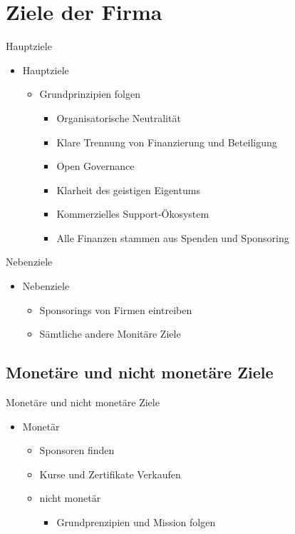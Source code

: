 \documentclass[11pt,aspectratio=169]{beamer}
\begin{document}
\section {Ziele der Firma}
\begin{frame}{Hauptziele}
	\begin{itemize}
		\item <1-> Hauptziele
		      \begin{itemize}

			      \item<2->Grundprinzipien folgen\cite{Grundprinziepe}
			            \begin{itemize}
				            \item<3-> Organisatorische Neutralität
				            \item<4-> Klare Trennung von Finanzierung und Beteiligung
				            \item<5-> Open Governance
				            \item<6-> Klarheit des geistigen Eigentums
				            \item<7-> Kommerzielles Support-Ökosystem
				            \item<8-> Alle Finanzen stammen aus Spenden und Sponsoring
			            \end{itemize}
		      \end{itemize}
	\end{itemize}
\end{frame}
\begin{frame}{Nebenziele}
	\begin{itemize}
		\item Nebenziele
		      \begin{itemize}
			      \item Sponsorings von Firmen eintreiben
			      \item Sämtliche andere Monitäre Ziele
		      \end{itemize}
	\end{itemize}
\end{frame}
\subsection {Monetäre und nicht monetäre Ziele}
\begin{frame}{Monetäre und nicht monetäre Ziele}
	\begin{itemize}
		\item Monetär
		      \begin{itemize}
			      \item Sponsoren finden
			      \item Kurse und Zertifikate Verkaufen\cite{Training}
		      \end{itemize}
		      \begin{itemize}
			      \item nicht monetär
			            \begin{itemize}
				            \item Grundprenzipien und Mission folgen\cite{Grundprinziepe}
			            \end{itemize}
		      \end{itemize}
	\end{itemize}
\end{frame}
\end{document}
